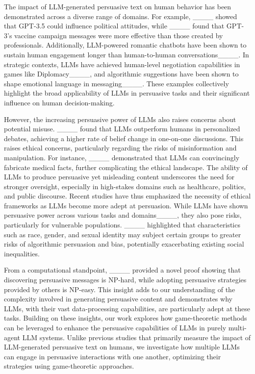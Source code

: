 The impact of LLM-generated persuasive text on human behavior has been demonstrated across a diverse range of domains. 
For example, ____ showed that GPT-3.5 could influence political attitudes, while ____ found that GPT-3’s vaccine campaign messages were more effective than those created by professionals. 
Additionally, LLM-powered romantic chatbots have been shown to sustain human engagement longer than human-to-human conversations____. 
In strategic contexts, LLMs have achieved human-level negotiation capabilities in games like Diplomacy____, and algorithmic suggestions have been shown to shape emotional language in messaging____. 
These examples collectively highlight the broad applicability of LLMs in persuasive tasks and their significant influence on human decision-making.

However, the increasing persuasive power of LLMs also raises concerns about potential misuse. 
____ found that LLMs outperform humans in personalized debates, achieving a higher rate of belief change in one-on-one discussions. 
This raises ethical concerns, particularly regarding the risks of misinformation and manipulation. 
For instance, ____ demonstrated that LLMs can convincingly fabricate medical facts, further complicating the ethical landscape. 
The ability of LLMs to produce persuasive yet misleading content underscores the need for stronger oversight, especially in high-stakes domains such as healthcare, politics, and public discourse.
Recent studies have thus emphasized the necessity of ethical frameworks as LLMs become more adept at persuasion. 
While LLMs have shown persuasive power across various tasks and domains____, they also pose risks, particularly for vulnerable populations. 
____ highlighted that characteristics such as race, gender, and sexual identity may subject certain groups to greater risks of algorithmic persuasion and bias, potentially exacerbating existing social inequalities. 

From a computational standpoint, ____ provided a novel proof showing that discovering persuasive messages is NP-hard, while adopting persuasive strategies provided by others is NP-easy. 
This insight adds to our understanding of the complexity involved in generating persuasive content and demonstrates why LLMs, with their vast data-processing capabilities, are particularly adept at these tasks.
Building on these insights, our work explores how game-theoretic methods can be leveraged to enhance the persuasive capabilities of LLMs in purely multi-agent LLM systems. 
Unlike previous studies that primarily measure the impact of LLM-generated persuasive text on humans, we investigate how multiple LLMs can engage in persuasive interactions with one another, optimizing their strategies using game-theoretic approaches.


